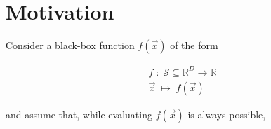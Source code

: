 \documentclass[12pt, letterpaper]{report}
\theoremstyle{definition}
\begin{document}




\section*{Motivation}

Consider a black-box function $f(\vec{x})$ of the form

\begin{equation}
	\begin{matrix}
		f\;:\;\mathcal{S}\subseteq\mathbb{R}^D\to\mathbb{R} \\
		\vec{x}\;\mapsto\;f(\vec{x})
	\end{matrix}
	\label{eqn:f}
\end{equation}

\noindent and assume that, while evaluating $f(\vec{x})$ is always possible,
\end{document}
